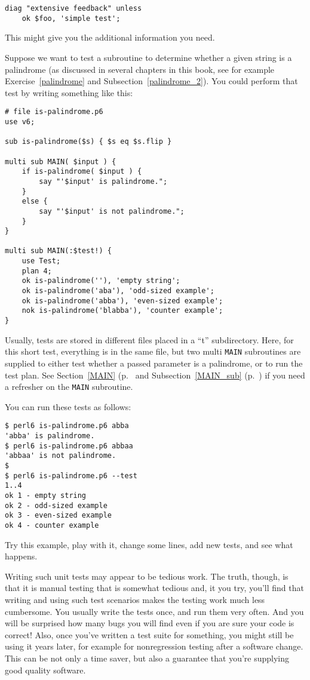 \begin{verbatim}
diag "extensive feedback" unless
    ok $foo, 'simple test';
\end{verbatim}

This might give you the additional information you need.

Suppose we want to test a subroutine to determine whether a 
given string is a palindrome (as discussed in several chapters 
in this book, see for example Exercise~\ref{palindrome} and 
Subsection~\ref{palindrome_2}). You could perform that test 
by writing something like this:

\begin{verbatim}
# file is-palindrome.p6
use v6;

sub is-palindrome($s) { $s eq $s.flip }

multi sub MAIN( $input ) {
    if is-palindrome( $input ) {
        say "'$input' is palindrome.";
    }
    else {
        say "'$input' is not palindrome.";
    }
}

multi sub MAIN(:$test!) {
    use Test;
    plan 4;
    ok is-palindrome(''), 'empty string';
    ok is-palindrome('aba'), 'odd-sized example';
    ok is-palindrome('abba'), 'even-sized example';
    nok is-palindrome('blabba'), 'counter example';
}
\end{verbatim}

Usually, tests are stored in different files placed in a ``t'' 
subdirectory. Here, for this short test, everything is in the 
same file, but two multi {\tt MAIN} subroutines are supplied 
to either test whether a passed parameter is a palindrome, or to 
run the test plan. See Section~\ref{MAIN} (p.~\pageref{MAIN} 
and Subsection~\ref{MAIN_sub} (p.~\pageref{MAIN_sub})
if you need a refresher on the {\tt MAIN} subroutine.

You can run these tests as follows:

\begin{verbatim}
$ perl6 is-palindrome.p6 abba
'abba' is palindrome.
$ perl6 is-palindrome.p6 abbaa
'abbaa' is not palindrome.
$
$ perl6 is-palindrome.p6 --test
1..4
ok 1 - empty string
ok 2 - odd-sized example
ok 3 - even-sized example
ok 4 - counter example
\end{verbatim}

Try this example, play with it, change some lines, add 
new tests, and see what happens.

Writing such unit tests may appear to be tedious work. 
The truth, though, is that it is manual testing that is 
somewhat tedious and, it you try, you'll find that 
writing and using such test scenarios makes the testing 
work much less cumbersome. You usually write the tests 
once, and run them very often. And you will be surprised 
how many bugs you will find even if you are sure your 
code is correct! Also, once you've written 
a test suite for something, you might still be using it 
years later, for example for nonregression testing after 
a software change. This can be not only a time saver, but 
also a guarantee that you're supplying good quality software.

